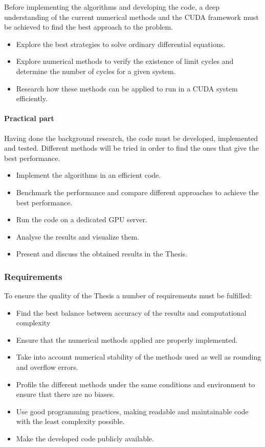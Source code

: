 Before implementing the algorithms and developing the code, a deep understanding
of the current numerical methods and the CUDA framework must be achieved to find
the best approach to the problem.

\begin{itemize}
    \item Explore the best strategies to solve ordinary differential equations.
    \item Explore numerical methods to verify the existence of limit cycles and determine the number of cycles for a given system.
    \item Research how these methods can be applied to run in a CUDA system efficiently.
\end{itemize}

\paragraph{Practical part} Having done the background research, the code must be
developed, implemented and tested.  Different methods will be tried in order to
find the ones that give the best performance.

\begin{itemize}
    \item Implement the algorithms in an efficient code.
    \item Benchmark the performance and compare different approaches to achieve the best performance.
    \item Run the code on a dedicated GPU server.
    \item Analyse the results and visualize them.
    \item Present and discuss the obtained results in the Thesis.
\end{itemize}

\subsubsection{Requirements}

To ensure the quality of the Thesis a number of requirements must be fulfilled:
\begin{itemize}
    \item Find the best balance between accuracy of the results and computational complexity
    \item Ensure that the numerical methods applied are properly implemented.
    \item Take into account numerical stability of the methods used as well as rounding and overflow errors.
    \item Profile the different methods under the same conditions and environment to ensure that there are no biases.
    \item Use good programming practices, making readable and maintainable code with the least complexity possible.
    \item Make the developed code publicly available.
\end{itemize}

